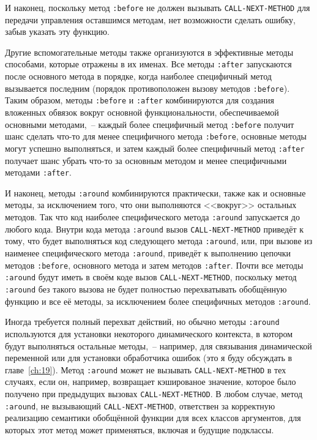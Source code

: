 И наконец, поскольку метод \lstinline{:before} не должен вызывать \lstinline{CALL-NEXT-METHOD} для
передачи управления оставшимся методам, нет возможности сделать ошибку, забыв указать эту
функцию.

Другие вспомогательные методы также организуются в эффективные методы способами, которые
отражены в их именах.  Все методы \lstinline{:after} запускаются после основного метода в
порядке, когда наиболее специфичный метод вызывается последним (порядок противоположен
вызову методов \lstinline{:before}).  Таким образом, методы \lstinline{:before} и \lstinline{:after}
комбинируются для создания вложенных обвязок вокруг основной функциональности,
обеспечиваемой основными методами,~-- каждый более специфичный метод \lstinline{:before} получит
шанс сделать что-то для менее специфичного метода \lstinline{:before}, основные методы могут
успешно выполняться, и затем каждый более специфичный метод \lstinline{:after} получает шанс
убрать что-то за основным методом и менее специфичными методами \lstinline{:after}.

И наконец, методы \lstinline{:around} комбинируются практически, также как и основные
методы, за исключением того, что они выполняются <<вокруг>> остальных методов. Так что код
наиболее специфического метода \lstinline{:around} запускается до любого кода. Внутри кода
метода \lstinline{:around} вызов \lstinline{CALL-NEXT-METHOD} приведёт к тому, что будет
выполняться код сле\-дую\-ще\-го метода \lstinline{:around}, или, при вызове из наименее
специфического метода \lstinline{:around}, приведёт к выполнению цепочки методов
\lstinline{:before}, основного метода и затем методов \lstinline{:after}.  Почти все
методы \lstinline{:around} будут иметь в своём коде вызов \lstinline{CALL-NEXT-METHOD},
поскольку метод \lstinline{:around} без такого вызова не будет полностью перехватывать
обобщённую функцию и все её методы, за исключением более специфичных методов
\lstinline{:around}.

Иногда требуется полный перехват действий, но обычно методы \lstinline{:around} используются
для установки некоторого динамического контекста, в котором будут выполняться остальные
методы,~-- например, для связывания динамической переменной или для установки обработчика
ошибок (это я буду обсуждать в главе~\ref{ch:19}).  Метод \lstinline{:around} может не вызывать
\lstinline{CALL-NEXT-METHOD} в тех случаях, если он, например, возвращает кэшированое значение,
которое было получено при предыдущих вызовах \lstinline{CALL-NEXT-METHOD}.  В любом случае,
метод \lstinline{:around}, не вызывающий \lstinline{CALL-NEXT-METHOD}, ответствен за корректную
реа\-ли\-за\-цию семантики обобщённой функции для всех классов аргументов, для которых этот
метод может применяться, включая и будущие подклассы.

